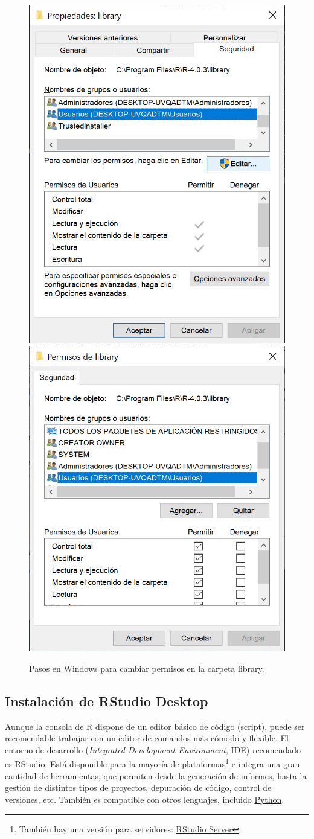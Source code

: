 \documentclass[
]{book}
\theoremstyle{break}
\theoremstyle{nonumberplain}
\begin{document}
\begin{figure}[!htb]

{\centering \includegraphics[width=0.45\linewidth]{figuras/propiedades} \includegraphics[width=0.45\linewidth]{figuras/permisos} 

}

\caption{Pasos en Windows para cambiar permisos en la carpeta library.}\label{fig:permisos-library}
\end{figure}

\hypertarget{ide}{%
\subsection{Instalación de RStudio Desktop}\label{ide}}

Aunque la consola de R dispone de un editor básico de código (script), puede ser recomendable trabajar con un editor de comandos más cómodo y flexible.
El entorno de desarrollo (\emph{Integrated Development Environment}, IDE) recomendado es \href{https://posit.co/products/open-source/rstudio}{RStudio}.
Está disponible para la mayoría de plataformas\footnote{También hay una versión para servidores: \href{https://posit.co/download/rstudio-server}{RStudio Server}} e integra una gran cantidad de herramientas, que permiten desde la generación de informes, hasta la gestión de distintos tipos de proyectos, depuración de código, control de versiones, etc.
También es compatible con otros lenguajes, incluido \href{https://support.posit.co/hc/en-us/articles/1500007929061-Using-Python-with-the-RStudio-IDE}{Python}.
\end{document}
